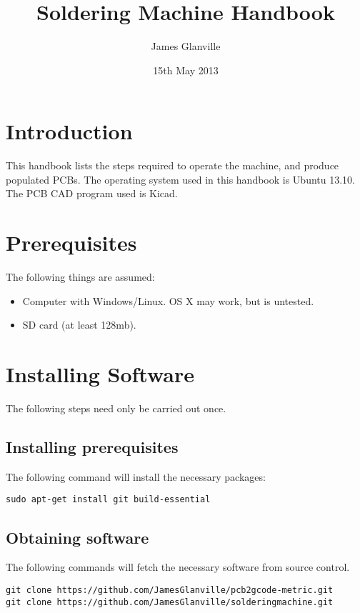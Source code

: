 \documentclass[a4paper,11pt]{article}  %
\title{Soldering Machine Handbook}
\author{James Glanville}
\date{15th May 2013}
\begin{document}
\maketitle

\tableofcontents

\newpage

\section{Introduction}

This handbook lists the steps required to operate the machine, and
produce populated PCBs. The operating system used in this handbook is
Ubuntu 13.10. The PCB CAD program used is Kicad.

\section{Prerequisites}
The following things are assumed:

\begin{itemize}
	\item	Computer with Windows/Linux. OS X may work, but is untested.
	\item	SD card (at least 128mb).
\end{itemize}

\section{Installing Software}
The following steps need only be carried out once.

\subsection{Installing prerequisites}
The following command will install the necessary packages:

\begin{lstlisting}[frame=single,breaklines=true]
sudo apt-get install git build-essential
\end{lstlisting}

\subsection{Obtaining software}
The following commands will fetch the necessary software from source control.

\begin{lstlisting}[frame=single,breaklines=true]
git clone https://github.com/JamesGlanville/pcb2gcode-metric.git
git clone https://github.com/JamesGlanville/solderingmachine.git
\end{lstlisting}
\end{document}
